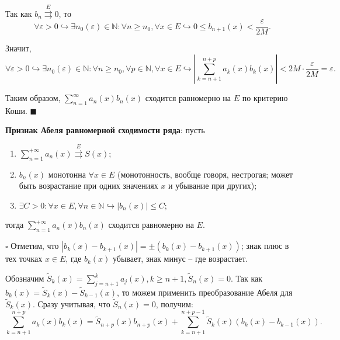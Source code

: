 \documentclass[12pt, a4paper, reqno]{article}
\begin{document}
    Так как $b_n \overset{E}{\rightrightarrows} 0$, то
    \begin{equation*}
        \forall \varepsilon > 0 \hookrightarrow \exists n_0(\varepsilon) \in \mathbb{N}:
        \forall n \geq n_0, \forall x \in E \hookrightarrow 0 \leq b_{n + 1}(x) < \frac{\varepsilon}{2M}.
    \end{equation*}

    Значит,
    \begin{equation*}
        \forall \varepsilon > 0 \hookrightarrow \exists n_0(\varepsilon) \in \mathbb{N}:
        \forall n \geq n_0, \forall p \in \mathbb{N}, \forall x \in E \hookrightarrow
        \left|\sum\limits_{k = n + 1}^{n + p} a_k(x)b_k(x)\right| < 2M \cdot \frac{\varepsilon}{2M} =
        \varepsilon.
    \end{equation*}

    Таким образом, $\sum\limits_{n = 1}^{\infty} a_n(x)b_n(x)$ сходится равномерно на $E$ по
    критерию Коши.
    $\blacksquare$

\newpage
    \textbf{Признак Абеля равномерной сходимости ряда}: пусть
    \begin{enumerate}
        \item $\sum\limits_{n = 1}^{+\infty} a_n(x) \overset{E}{\rightrightarrows} S(x)$;
        \item $b_n(x)$ монотонна $\forall x \in E$ (монотонность, вообще говоря, нестрогая; может
              быть возрастание при одних значениях $x$ и убывание при других);
        \item $\exists C > 0: \forall x \in E, \forall n \in \mathbb{N} \hookrightarrow |b_n(x)| \leq C$;
    \end{enumerate}
    тогда $\sum\limits_{n = 1}^{+\infty} a_n(x)b_n(x)$ сходится равномерно на $E$.

    $\square$
    Отметим, что $|b_k(x) - b_{k + 1}(x)| = \pm(b_k(x) - b_{k + 1}(x))$; знак плюс в тех точках $x \in E$,
    где $b_k(x)$ убывает, знак минус -- где возрастает.

    Обозначим $\tilde{S}_k(x) = \sum\limits_{j = n + 1}^{k} a_j(x), k \geq n + 1, \tilde{S}_n(x) = 0$.
    Так как $b_k(x) = \tilde{S}_k(x) - \tilde{S}_{k - 1}(x)$, то можем применить преобразование
    Абеля для $\tilde{S}_k(x)$. Сразу учитывая, что $\tilde{S}_n(x) = 0$, получим:
    \begin{equation*}
        \sum\limits_{k = n + 1}^{n + p} a_k(x) b_k(x) =
        \tilde{S}_{n + p}(x)b_{n + p}(x) +
            \sum\limits_{k = n + 1}^{n + p - 1} \tilde{S}_k(x)(b_k(x) - b_{k - 1}(x)).
    \end{equation*}
\end{document}
